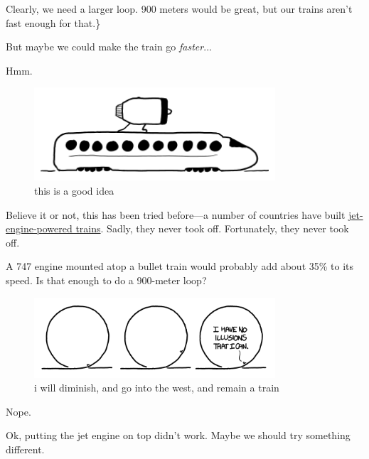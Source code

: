 {Clearly, we need a larger loop. 900 meters would be great, but our trains aren’t fast enough for that.\}

{But maybe we could make the train go \emph{faster}...}

{Hmm.}

\begin{figure}[!htbp]
\centering
\includegraphics[scale=0.5, max width=0.8\textwidth]{imgs/a/43/train_loop_jet.png}
\caption{this is a good idea}
\end{figure}

{Believe it or not, this has been tried before—a number of countries have built \href{http://en.wikipedia.org/wiki/Turbojet\_train}{jet-engine-powered trains}. Sadly, they never took off. Fortunately, they never took off.}

{A 747 engine mounted atop a bullet train would probably add about 35\% to its speed. Is that enough to do a 900-meter loop?}

\begin{figure}[!htbp]
\centering
\includegraphics[scale=0.5, max width=0.8\textwidth]{imgs/a/43/train_loop_900_747.png}
\caption{i will diminish, and go into the west, and remain a train}
\end{figure}

{Nope.}

{Ok, putting the jet engine on top didn’t work. Maybe we should try something different.}

}
